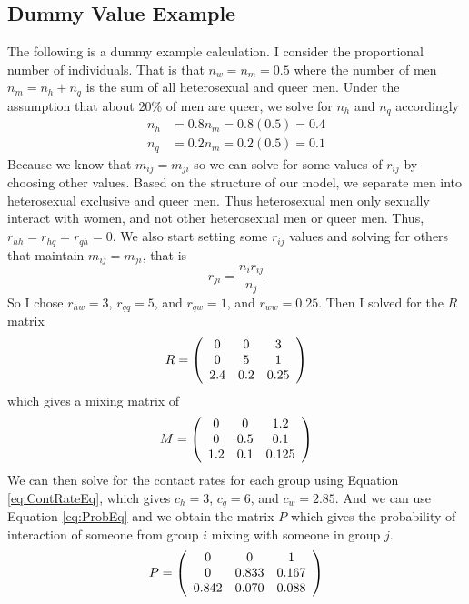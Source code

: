 \documentclass[12pt]{article}
\begin{document}
\subsection*{Dummy Value Example}

The following is a dummy example calculation.  I consider the proportional number of individuals.  That is that $n_w=n_m=0.5$ where the number of men $n_m=n_h+n_q$ is the sum of all heterosexual and queer men.  Under the assumption that about 20\% of men are queer, we solve for $n_h$ and $n_q$ accordingly
\begin{align}
n_h&=0.8n_m = 0.8(0.5) = 0.4\\
n_q&=0.2n_m = 0.2(0.5) = 0.1
\end{align}
Because we know that $m_{ij}=m_{ji}$ so we can solve for some values of $r_{ij}$ by choosing other values.  Based on the structure of our model, we separate men into heterosexual exclusive and queer men.  Thus heterosexual men only sexually interact with women, and not other heterosexual men or queer men. Thus, $r_{hh}=r_{hq}=r_{qh}=0$.  We also start setting some $r_{ij}$ values and solving for others that maintain $m_{ij}=m_{ji}$, that is
\begin{equation}
r_{ji}=\frac{n_ir_{ij}}{n_j}
\end{equation}
So I chose $r_{hw}=3$, $r_{qq}=5$, and $r_{qw}=1$, and $r_{ww}=0.25$.  Then I solved for the $R$ matrix
\begin{equation}
R=\left(\begin{array}{c c c}
0 & 0 & 3 \\
0 & 5 & 1 \\
2.4 & 0.2 & 0.25
\end{array}\right)
\end{equation}
which gives a mixing matrix of 
\begin{equation}
M=\left(\begin{array}{c c c}
0 & 0 & 1.2 \\
0 & 0.5 & 0.1 \\
1.2 & 0.1 & 0.125
\end{array}\right)
\end{equation}
We can then solve for the contact rates for each group using Equation \eqref{eq:ContRateEq}, which gives $c_h=3$, $c_q=6$, and $c_w=2.85$. And we can use Equation \eqref{eq:ProbEq} and we obtain the matrix $P$ which gives the probability of interaction of someone from group $i$ mixing with someone in group $j$. 
\begin{equation}
P=\left(\begin{array}{c c c}
0 & 0 & 1 \\
0 & 0.833 & 0.167 \\
0.842 & 0.070 & 0.088
\end{array}\right)
\end{equation}
\end{document}
